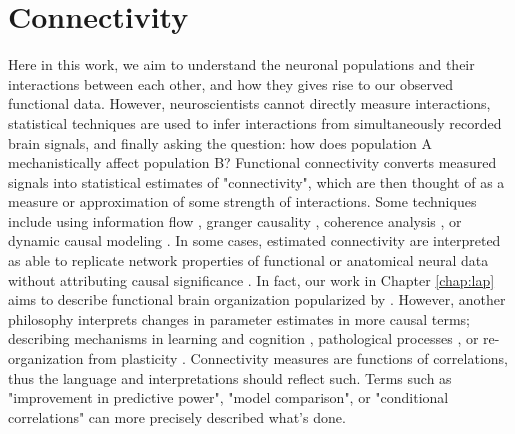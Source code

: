 \section{Connectivity}
Here in this work, we aim to understand the neuronal populations and their interactions between each other, and how they gives rise to our observed functional data. However, neuroscientists cannot directly measure interactions, statistical techniques are used to infer interactions from simultaneously recorded brain signals, and finally asking the question: how does population A mechanistically affect population B? Functional connectivity converts measured signals into statistical estimates of "connectivity", which are then thought of as a measure or approximation of some strength of interactions. Some techniques include using information flow \cite{babiloni_estimation_2005}, granger causality \cite{bressler_wiener-granger_2011}, coherence analysis \cite{bastos_tutorial_2016,sun_measuring_2004}, or dynamic causal modeling \cite{daunizeau_dynamic_2009}. In some cases, estimated connectivity are interpreted as able to replicate network properties of functional or anatomical neural data without attributing causal significance \cite{raichle_default_2001,smith_correspondence_2009,Yeo2011}. In fact, our work in Chapter \ref{chap:lap} aims to describe functional brain organization popularized by \cite{Yeo2011}. However, another philosophy interprets changes in parameter estimates in more causal terms; describing mechanisms in learning and cognition \cite{siegel_spectral_2012,nauhaus_stimulus_2009,bassett_learning-induced_2015}, pathological processes \cite{wu_changes_2009,pawela_interhemispheric_2010,karlsgodt_diffusion_2008,hacker_resting_2012}, or re-organization from plasticity \cite{lueken_neural_2013,hallam_task-based_2018}. Connectivity measures are functions of correlations, thus the language and interpretations should reflect such. Terms such as "improvement in predictive power", "model comparison", or "conditional correlations" can more precisely described what's done. 

